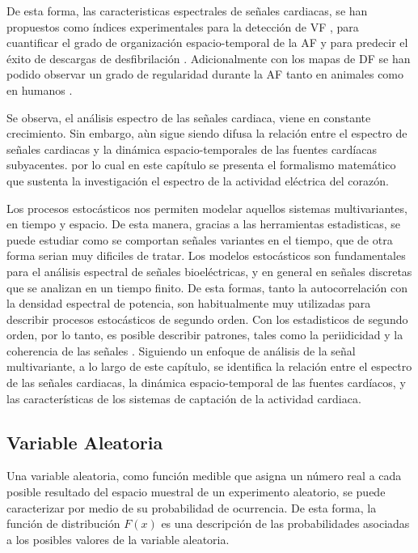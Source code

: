 De esta forma, las caracteristicas espectrales de señales cardiacas, se han
propuestos como índices experimentales para la detección de \ac{VF} \cite
{Barro89}, para cuantificar el grado de organización espacio-temporal de la
\ac{AF} \cite{Everett01a} y para predecir el éxito de
descargas de desfibrilación \cite{Strohmenger97, Eftestol00, Jekova04}.
Adicionalmente con los mapas de \ac{DF} se han podido observar un grado de
regularidad durante la \ac{AF} tanto en animales \cite{Skanes98,
Mandapati00, Mansour01} como en humanos \cite{Sanders05, Atienza06}.

Se observa, el análisis espectro de las señales cardiaca, viene en
constante crecimiento. Sin embargo, aùn sigue siendo difusa la relación entre el
espectro de señales cardiacas y la dinámica espacio-temporales de las fuentes
cardíacas subyacentes. por lo cual en este capítulo se presenta  el formalismo
matemático que sustenta la investigación el espectro de la actividad eléctrica
del corazón.




Los procesos estocásticos nos permiten modelar aquellos sistemas multivariantes,
en tiempo y espacio. De esta manera, gracias a las herramientas estadisticas, se
puede estudiar como se comportan señales variantes en el tiempo, que de otra
forma serian muy dificiles de tratar. Los modelos estocásticos son fundamentales
para el análisis espectral de señales bioeléctricas, y en general en señales
discretas que se analizan en un tiempo finito. De esta formas, tanto la
autocorrelación con la densidad espectral de potencia, son habitualmente muy
utilizadas para describir procesos estocásticos de segundo orden. Con los
estadisticos de segundo orden, por lo tanto, es posible describir patrones,
tales como la periidicidad y la coherencia de las señales
\cite{Requena08}. Siguiendo un enfoque de análisis de la señal multivariante, a
lo largo de este capítulo, se identifica la relación entre el
espectro de las señales cardiacas, la dinámica espacio-temporal de las fuentes
cardíacos, y las características de los sistemas de captación de la actividad
cardiaca.





\subsection{Variable Aleatoria}\label{subs:varaleatoria}

Una variable aleatoria, como función medible que asigna un número real a cada
posible resultado del espacio muestral de un experimento aleatorio, se puede
caracterizar por medio de su probabilidad de ocurrencia. De esta forma, la
función de distribución ${F(x)}$  es una descripción de las probabilidades
asociadas a los posibles valores de la variable aleatoria.


